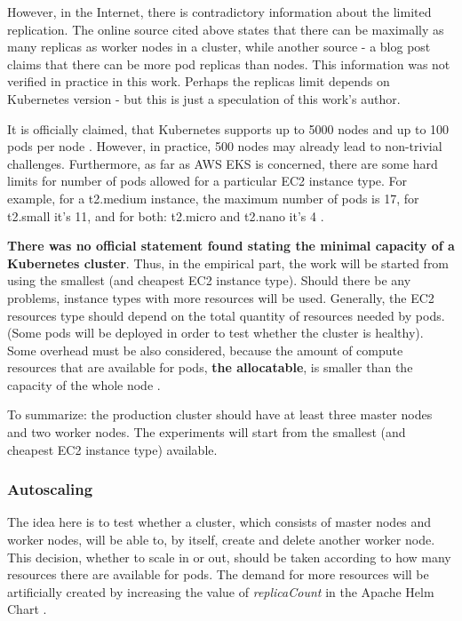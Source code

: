 However, in the Internet, there is contradictory information about the limited replication. The online source cited above \cite{kubernetes-node-size} states that there can be maximally as many replicas as worker nodes in a cluster, while another source - a blog post \cite{learnk8s-ll} claims that there can be more pod replicas than nodes. This information was not verified in practice in this work. Perhaps the replicas limit depends on Kubernetes version - but this is just a speculation of this work's author.

It is officially claimed, that Kubernetes supports up to 5000 nodes and up to 100 pods per node \cite{kubernetes-node-size} \cite{kubernetes-large}. However, in practice, 500 nodes may already lead to non-trivial challenges. Furthermore, as far as AWS EKS is concerned, there are some hard limits for number of pods allowed for a particular EC2 instance type. For example, for a t2.medium instance, the maximum number of pods is 17, for t2.small it's 11, and for both: t2.micro and t2.nano it's 4 \cite{kubernetes-node-size} \cite{eks-hard-limits}.

\textbf{There was no official statement found stating the minimal capacity of a Kubernetes cluster}. Thus, in the empirical part, the work will be started from using the smallest (and cheapest EC2 instance type). Should there be any problems, instance types with more resources will be used. Generally, the EC2 resources type should depend on the total quantity of resources needed by pods. (Some pods will be deployed in order to test whether the cluster is healthy). Some overhead must be also considered, because the amount of compute resources that are available for pods, \textbf{the allocatable}, is smaller than the capacity of the whole node \cite{k8s-alloc}.

To summarize: the production cluster should have at least three master nodes and two worker nodes. The experiments will start from the smallest (and cheapest EC2 instance type) available.

\subsubsection{Autoscaling}

The idea here is to test whether a cluster, which consists of master nodes and worker nodes, will be able to, by itself, create and delete another worker node. This decision, whether to scale in or out, should be taken according to how many resources there are available for pods. The demand for more resources will be artificially created by increasing the value of \textit{replicaCount} in the Apache Helm Chart \cite{helm-apache}.


